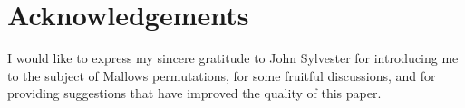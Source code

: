 \documentclass[letterpaper,11pt]{article}
\theoremstyle{definition}
\theoremstyle{remark}
\begin{document}
\section*{Acknowledgements}

I would like to express my sincere gratitude to John Sylvester for introducing me to the subject of Mallows permutations, for some fruitful discussions, and for providing suggestions that have improved the quality of this paper.



%
%

\end{document}
